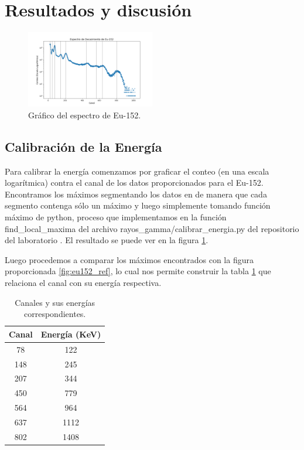 \documentclass[twocolumn,a4paper,11pt]{scrartcl}
\begin{document}
\section{Resultados y discusión}

\begin{figure}[]
  \includegraphics[width=0.50\textwidth]{Eu-152_graph.png}
  \caption{Gráfico del espectro de Eu-152.}
  \label{fig:eu152_graph}
\end{figure}

\subsection*{Calibración de la Energía}
Para calibrar la energía comenzamos por graficar el conteo (en una escala logarítmica) contra el canal de los datos proporcionados para el Eu-152. Encontramos los máximos segmentando los datos en de manera que cada segmento contenga sólo un máximo y luego simplemente tomando función máximo de python, proceso que implementamos en la función find\_local\_maxima del archivo rayos\_gamma/calibrar\_energia.py del repositorio del laboratorio \cite{BrianDL_laboratorio}. El resultado se puede ver en la figura \ref{fig:eu152_graph}.

Luego procedemos a comparar los máximos encontrados con la figura proporcionada \ref{fig:eu152_ref}, lo cual nos permite construir la tabla \ref{tab:channels_energies} que relaciona el canal con su energía respectiva.

\begin{table}[h]
  \centering
  \begin{tabular}{c c}
      \hline
      Canal & Energía (KeV) \\
      \hline
      78 & 122 \\
      148 & 245 \\
      207 & 344 \\
      450 & 779 \\
      564 & 964 \\
      637 & 1112 \\
      802 & 1408 \\
      \hline
  \end{tabular}
  \caption{Canales y sus energías correspondientes.}
  \label{tab:channels_energies}
\end{table}
\end{document}
